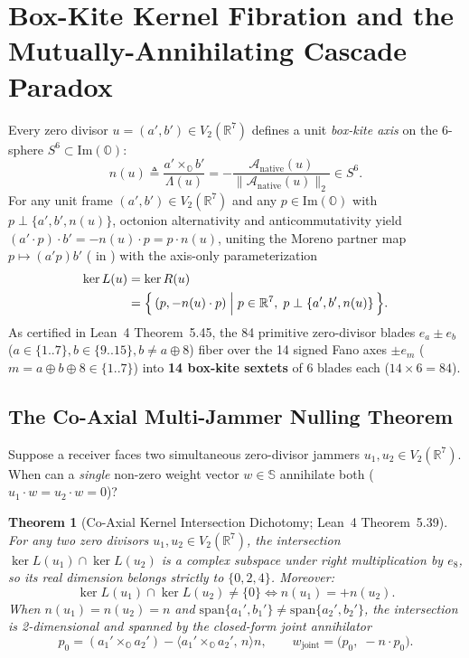 \documentclass[journal,twoside]{IEEEtran}
\newtheorem{theorem}{Theorem}
\theoremstyle{definition}
\theoremstyle{remark}
\newcommand{\R}{\mathbb{R}}
\newcommand{\Oc}{\mathbb{O}}
\newcommand{\Se}{\mathbb{S}}
\newcommand{\ImPart}{\mathrm{Im}}
\newcommand{\Anative}{\mathcal{A}_{\mathrm{native}}}
\begin{document}
\section{Box-Kite Kernel Fibration and the Mutually-Annihilating Cascade Paradox}
\label{sec:cascades}
Every zero divisor $u = (a', b') \in V_2(\R^7)$ defines a unit \emph{box-kite axis} on the 6-sphere $S^6 \subset \ImPart(\Oc)$:
\begin{equation}
    n(u) \triangleq \frac{a' \times_{\Oc} b'}{\Lambda(u)} = -\frac{\Anative(u)}{\|\Anative(u)\|_2} \in S^6.
    \label{eq:box_kite_axis}
\end{equation}
For any unit frame $(a', b') \in V_2(\R^7)$ and any $p \in \ImPart(\Oc)$ with $p \perp \{a', b', n(u)\}$, octonion alternativity and anticommutativity yield $(a' \cdot p)\cdot b' = -n(u)\cdot p = p \cdot n(u)$, uniting the Moreno partner map $p \mapsto (a' p) b'$ ( in \cite{Agourakis2026PG32}) with the axis-only parameterization
\begin{equation}
\begin{aligned}
    \ker L(u) &= \ker R(u) \\
              &= \Bigl\{\, (p, -n(u)\cdot p) \;\Big|\; p \in \R^7,\; p \perp \{a', b', n(u)\} \,\Bigr\}.
\end{aligned}
\label{eq:ker_param}
\end{equation}
As certified in Lean~4 Theorem~5.45, the 84 primitive zero-divisor blades $e_a \pm e_b$ ($a \in \{1..7\}, b \in \{9..15\}, b \neq a \oplus 8$) fiber over the 14 signed Fano axes $\pm e_m$ ($m = a \oplus b \oplus 8 \in \{1..7\}$) into \textbf{14 box-kite sextets} of 6 blades each ($14 \times 6 = 84$).

\subsection{The Co-Axial Multi-Jammer Nulling Theorem}
Suppose a receiver faces two simultaneous zero-divisor jammers $u_1, u_2 \in V_2(\R^7)$. When can a \emph{single} non-zero weight vector $w \in \Se$ annihilate both ($u_1 \cdot w = u_2 \cdot w = 0$)?

\begin{theorem}[Co-Axial Kernel Intersection Dichotomy; Lean~4 Theorem~5.39]
\label{thm:coaxial}
For any two zero divisors $u_1, u_2 \in V_2(\R^7)$, the intersection $\ker L(u_1) \cap \ker L(u_2)$ is a complex subspace under right multiplication by $e_8$, so its real dimension belongs strictly to $\{0, 2, 4\}$. Moreover:
\begin{equation}
    \ker L(u_1) \cap \ker L(u_2) \neq \{0\} \iff n(u_1) = +n(u_2).
\end{equation}
When $n(u_1) = n(u_2) = n$ and $\mathrm{span}\{a_1', b_1'\} \neq \mathrm{span}\{a_2', b_2'\}$, the intersection is 2-dimensional and spanned by the closed-form joint annihilator
\begin{equation}
    p_0 = (a_1' \times_{\Oc} a_2') - \langle a_1' \times_{\Oc} a_2',\, n\rangle n, \qquad w_{\mathrm{joint}} = \bigl(p_0,\; -n \cdot p_0\bigr).
    \label{eq:w_joint}
\end{equation}
\end{theorem}
\end{document}
